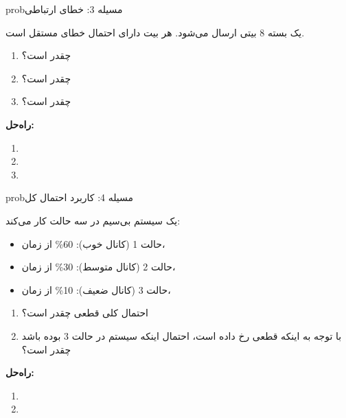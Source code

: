 \begin{PSbox}[unbreakable]{prob}{مسیله 3: خطای ارتباطی}

یک بسته 8 بیتی ارسال می‌شود. هر بیت دارای احتمال خطای مستقل  است.

\begin{enumerate}
\def\labelenumi{(\PSalph{enumi})}
\tightlist
\item
   چقدر است؟
\item
   چقدر است؟
\item
   چقدر است؟
\end{enumerate}

\textbf{راه‌حل:}

\begin{enumerate}
\def\labelenumi{(\PSalph{enumi})}
\item
\item
\item
\end{enumerate}

\end{PSbox}

\begin{PSbox}[unbreakable]{prob}{مسیله 4: کاربرد احتمال کل}

یک سیستم بی‌سیم در سه حالت کار می‌کند:

\begin{itemize}
\tightlist
\item
  حالت 1 (کانال خوب): 60\% از زمان، 
\item
  حالت 2 (کانال متوسط): 30\% از زمان، 
\item
  حالت 3 (کانال ضعیف): 10\% از زمان، 
\end{itemize}

\begin{enumerate}
\def\labelenumi{(\PSalph{enumi})}
\tightlist
\item
  احتمال کلی قطعی چقدر است؟
\item
  با توجه به اینکه قطعی رخ داده است، احتمال اینکه سیستم در حالت 3 بوده باشد چقدر است؟
\end{enumerate}

\textbf{راه‌حل:}

\begin{enumerate}
\def\labelenumi{(\PSalph{enumi})}
\item
\item
\end{enumerate}

\end{PSbox}

